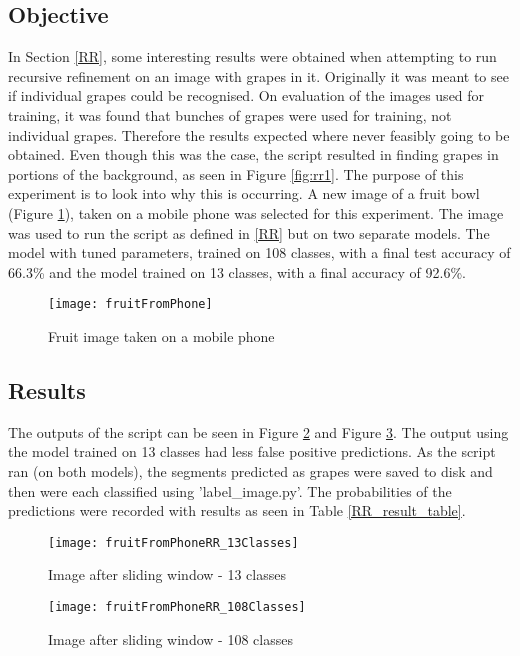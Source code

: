 \subsection*{Objective}
In Section \ref{RR}, some interesting results were obtained when attempting to run recursive refinement on an image with grapes in it.
Originally it was meant to see if individual grapes could be recognised.
On evaluation of the images used for training, it was found that bunches of grapes were used for training, not individual grapes. Therefore the results expected where never feasibly going to be obtained.
Even though this was the case, the script resulted in finding grapes in portions of the background, as seen in Figure \ref{fig:rr1}.
The purpose of this experiment is to look into why this is occurring.
A new image of a fruit bowl (Figure \ref{fig:fruitFromPhone}), taken on a mobile phone was selected for this experiment.
The image was used to run the script as defined in \ref{RR} but on two separate models.
The model with tuned parameters, trained on 108 classes, with a final test accuracy of 66.3\% and the model trained on 13 classes, with a final accuracy of 92.6\%.

\begin{figure}[h]
\centering
    \texttt{[image: fruitFromPhone]}
      \caption{Fruit image taken on a mobile phone}
      \label{fig:fruitFromPhone}
\end{figure}

\subsection*{Results}
The outputs of the script can be seen in Figure \ref{fig:fruitRR13} and Figure \ref{fig:fruitRR108}. The output using the model trained on 13 classes had less false positive predictions. As the script ran (on both models), the segments predicted as grapes were saved to disk and then were each classified using 'label\_image.py'. The probabilities of the predictions were recorded with results as seen in Table \ref{RR_result_table}.

\begin{figure}[h]
\centering
    \texttt{[image: fruitFromPhoneRR\_13Classes]}
      \caption{Image after sliding window - 13 classes}
      \label{fig:fruitRR13}
\end{figure}

\begin{figure}[h]
	\centering
    \texttt{[image: fruitFromPhoneRR\_108Classes]}
      \caption{Image after sliding window - 108 classes}
      \label{fig:fruitRR108}
\end{figure}

